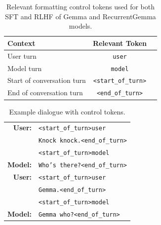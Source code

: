 \documentclass[9pt, a4paper, logo, twocolumn, copyright, nonumbering]{googledeepmind}
\begin{document}
\begin{table}[t]
\caption{Relevant formatting control tokens used for both SFT and RLHF of Gemma and RecurrentGemma models.}
    \setlength{\tabcolsep}{6pt}
    \centering
    \footnotesize
    \begin{tabular}{l c c}
    \toprule
    \textbf{Context} & \textbf{Relevant Token} \\
        \midrule
        \scriptsize{User turn} & \texttt{\color{NavyBlue}user} \\
        \midrule
        \scriptsize{Model turn} & \texttt{\color{NavyBlue}model} \\
        \midrule
        \scriptsize{Start of conversation turn} & \texttt{\color{NavyBlue}<start\_of\_turn>} \\
        \midrule
        \scriptsize{End of conversation turn} & \texttt{\color{NavyBlue}<end\_of\_turn>} \\
    \bottomrule
    \end{tabular}
    \label{tab:formatting_tokens}
\end{table}
\begin{table}[t!]
    \caption{Example dialogue with control tokens.}
    \setlength{\tabcolsep}{6pt}
    \centering
    \footnotesize   
    \begin{tabular}{r l}
    \toprule
    \vspace{0.2cm}
    \textbf{User:} & {\color{NavyBlue}\texttt{<start\_of\_turn>user}} \vspace{-0.2cm} \\
    & \texttt{Knock knock.}{\color{NavyBlue}\texttt{<end\_of\_turn>}} \\
    & {\color{NavyBlue}\texttt{<start\_of\_turn>model}} \vspace{0.1cm} \\
    
    \textbf{Model:} & \texttt{Who's there?}{\color{NavyBlue}\texttt{<end\_of\_turn>}} \vspace{0.1cm} \\

    \textbf{User:} & {\color{NavyBlue}\texttt{<start\_of\_turn>user}} \\
    & \texttt{Gemma.}{\color{NavyBlue}\texttt{<end\_of\_turn>}} \\
    & {\color{NavyBlue}\texttt{<start\_of\_turn>model}} \vspace{0.1cm} \\

    \textbf{Model:} & \texttt{Gemma who?}{\color{NavyBlue}\texttt{<end\_of\_turn>}} \vspace{0.1cm} \\

    \bottomrule
    \end{tabular}
    \label{tab:sample_dialogue}
\end{table}
\end{document}
